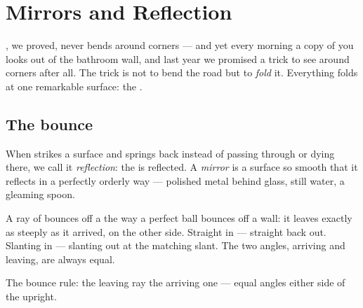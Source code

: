 \chapter{Mirrors and Reflection}\label{ch:g5:mirrors-reflection}

, we proved, never bends around corners --- and yet every
morning a copy of you looks out of the bathroom wall, and last year
we promised a trick to see around corners after all. The trick is
not to bend the road but to \emph{fold} it. Everything folds at one
remarkable surface: the .

\section{The bounce}

\begin{definition}[Reflection]\label{def:g5:mirrors-reflection:reflection}
When  strikes a surface and springs back instead of passing
through or dying there, we call it
\emph{reflection}: the  is reflected. A
\emph{mirror} is a surface so smooth that it reflects
 in a perfectly orderly way --- polished metal behind glass,
still water, a gleaming spoon.
\end{definition}

\begin{proposition}\label{prop:g5:mirrors-reflection:bounce}
A ray of  bounces off a  the way a perfect ball bounces
off a wall: it leaves exactly as steeply as it arrived, on the
other side. Straight in --- straight back out. Slanting in ---
slanting out at the matching slant. The two angles, arriving and
leaving, are always equal.
\end{proposition}

\begin{omfigure}

{\small The bounce rule: the leaving ray  the arriving one
--- equal angles either side of the upright.}
\end{omfigure}

